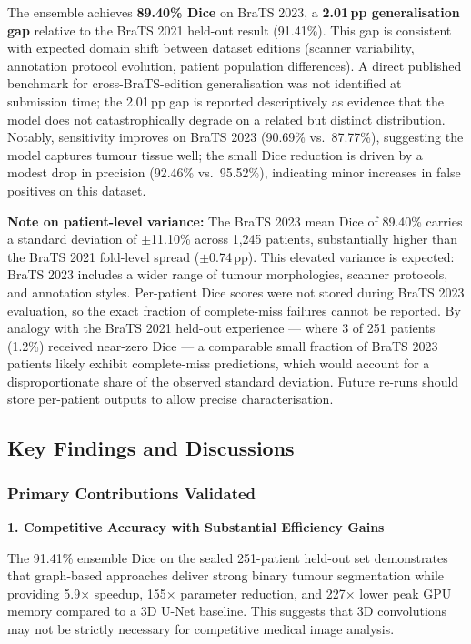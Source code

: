\documentclass{article}
\begin{document}
The ensemble achieves \textbf{89.40\% Dice} on BraTS 2023, a \textbf{2.01\,pp generalisation gap} relative to the BraTS 2021 held-out result (91.41\%). This gap is consistent with expected domain shift between dataset editions (scanner variability, annotation protocol evolution, patient population differences). A direct published benchmark for cross-BraTS-edition generalisation was not identified at submission time; the 2.01\,pp gap is reported descriptively as evidence that the model does not catastrophically degrade on a related but distinct distribution. Notably, sensitivity improves on BraTS 2023 (90.69\% vs.\ 87.77\%), suggesting the model captures tumour tissue well; the small Dice reduction is driven by a modest drop in precision (92.46\% vs.\ 95.52\%), indicating minor increases in false positives on this dataset.

\textbf{Note on patient-level variance:} The BraTS 2023 mean Dice of 89.40\% carries a standard deviation of $\pm$11.10\% across 1,245 patients, substantially higher than the BraTS 2021 fold-level spread ($\pm$0.74\,pp). This elevated variance is expected: BraTS 2023 includes a wider range of tumour morphologies, scanner protocols, and annotation styles. Per-patient Dice scores were not stored during BraTS 2023 evaluation, so the exact fraction of complete-miss failures cannot be reported. By analogy with the BraTS 2021 held-out experience — where 3 of 251 patients (1.2\%) received near-zero Dice — a comparable small fraction of BraTS 2023 patients likely exhibit complete-miss predictions, which would account for a disproportionate share of the observed standard deviation. Future re-runs should store per-patient outputs to allow precise characterisation.


\subsection{Key Findings and Discussions}

\subsubsection{Primary Contributions Validated}

\textbf{1. Competitive Accuracy with Substantial Efficiency Gains}

The 91.41\% ensemble Dice on the sealed 251-patient held-out set demonstrates that graph-based approaches deliver strong binary tumour segmentation while providing 5.9$\times$ speedup, 155$\times$ parameter reduction, and 227$\times$ lower peak GPU memory compared to a 3D U-Net baseline. This suggests that 3D convolutions may not be strictly necessary for competitive medical image analysis.
\end{document}

